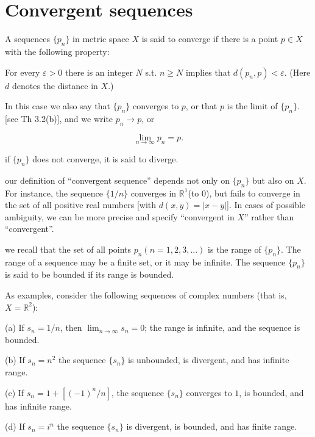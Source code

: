 \section{Convergent sequences}

\begin{myDef}\label{myDef:3.1 converge}
    A sequences 
    $\{p_n\}$ 
    in metric space $X$ is said to converge if there is a point $p \in X$ with the following property:
    
    For every $\varepsilon >0$ there is an integer $N$ s.t. $n \geq N$ implies that $d(p_n, p) < \varepsilon$. (Here $d$ denotes the distance in $X$.)

    In this case we also say that $\{p_n\}$ converges to $p$, or that $p$ is the limit of $\{p_n\}$. [see Th 3.2(b)], and we write $p_n \rightarrow p$, or

    \begin{equation*}
        \lim_{n \to \infty} p_n = p.
    \end{equation*}

    if $\{p_n\}$ does not converge, it is said to diverge.
\end{myDef}

our definition of ``convergent sequence'' depends not only on $\{p_n\}$ but also on $X$. For instance, the sequence $\{1/n\}$ converges in $\mathbb{R}^1$(to $0$), but fails to converge in the set of all positive real numbers [with $d(x,y) = |x-y|$]. 
In cases of possible ambiguity, we can be more
precise and specify ``convergent in $X$'' rather than ``convergent''.

we recall that the set of all points $p_n (n=1,2, 3,...)$ is the range of 
$\{p_n\}$.
The range of a sequence may be a finite set, or it may be infinite. The sequence
$\{p_n\}$ is said to be bounded if its range is bounded.

As examples, consider the following sequences of complex numbers
(that is, $X = \mathbb{R}^2$):

(a) If $s_n=1/n$, then $\lim_{n \to \infty} s_n = 0$; the range is infinite, and the sequence is bounded.

(b) If $s_n=n^2$ the sequence $\{s_n\}$ is unbounded, is divergent, and has
infinite range.

(c) If $s_n = 1+[(- 1)^n/n]$, the sequence $\{s_n\}$ converges to $1$, is bounded, and has infinite range.

(d) If $s_n =i^n$ the sequence $\{s_n\}$ is divergent, is bounded, and has finite range.

